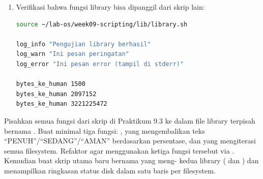 \begin{enumerate}
    \textit{Amati:} skrip  tidak mendefinisikan
    sendiri fungsi seperti  atau .
    Semua diambil dari library menggunakan . Jika kamu perlu
    memperbaiki cara penulisan log, cukup ubah di  dan
    semua skrip yang menggunakannya ikut berubah.

    \item Verifikasi bahwa fungsi library bisa dipanggil dari skrip lain:
\begin{lstlisting}[language=bash, caption={Menguji fungsi library secara langsung}]
source ~/lab-os/week09-scripting/lib/library.sh

log_info "Pengujian library berhasil"
log_warn "Ini pesan peringatan"
log_error "Ini pesan error (tampil di stderr)"

bytes_ke_human 1500
bytes_ke_human 2097152
bytes_ke_human 3221225472
\end{lstlisting}
\end{enumerate}

\begin{challengebox}
Pisahkan semua fungsi dari skrip  di Praktikum 9.3
ke dalam file library terpisah bernama . Buat
minimal tiga fungsi: , 
yang mengembalikan teks ``PENUH''/``SEDANG''/``AMAN'' berdasarkan
persentase, dan  yang mengiterasi semua
filesystem. Refaktor  agar menggunakan ketiga fungsi
tersebut via . Kemudian buat skrip utama baru bernama
 yang meng- kedua library
( dan ) dan menampilkan ringkasan
status disk dalam satu baris per filesystem.
\end{challengebox}

